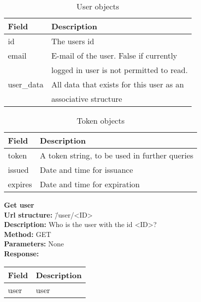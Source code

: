 \documentclass[11pt]{article}
\begin{document}
\begin{table}[H]
\caption{User objects}
\begin{center}
\begin{tabular}{|l|l|}
\hline
 Field                   &  Description                               \\
\hline
 id                      &  The users id                              \\
 \hline
 email                   &  E-mail of the user. False if currently    \\
                         &  logged in user is not permitted to read.  \\
\hline                         
 user\_data  &  All data that exists for this user as an  \\
                         &  associative structure                     \\
\hline
\end{tabular}
\end{center}
\end{table}

\begin{table}[H]
\caption{Token objects}
\begin{center}
\begin{tabular}{|l|l|}
\hline
 Field    &  Description                                    \\
\hline
 token    &  A token string, to be used in further queries  \\
 issued   &  Date and time for issuance                     \\
 expires  &  Date and time for expiration                   \\
\hline
\end{tabular}
\end{center}
\end{table}
 
\begin{tabbing}
\textbf{Get user} \\
\textcolor{black!60}{\textbf{Url structure:}} \hspace{0.2in} \= /user/<ID> \\
\textcolor{black!60}{\textbf{Description:}}  \> Who is the user with the id <ID>? \\
\textcolor{black!60}{\textbf{Method:}} \> GET \\
\textcolor{black!60}{\textbf{Parameters:}}  \> None \\
\textcolor{black!60}{\textbf{Response:}} \\ \>
\begin{tabular}{|l|l|}
\hline
 Field  &  Description  \\
\hline
 user   &  user         \\
\hline
\end{tabular}
\end{tabbing}
\end{document}
